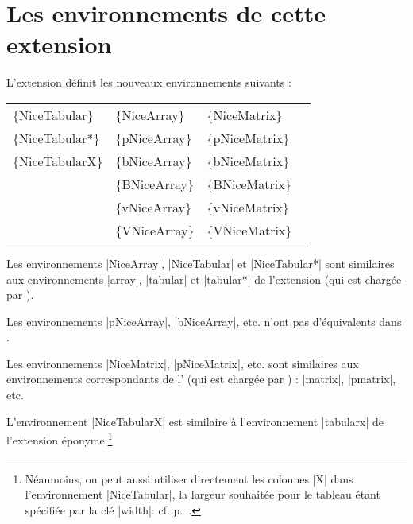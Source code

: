 \documentclass[dvipsnames]{article}%
\begin{document}
\newpage

\section{Les environnements de cette extension}




L'extension  définit les nouveaux environnements suivants :

\medskip
\begin{ttfamily}
\setlength{\tabcolsep}{3mm}
\begin{tabular}{llll}
\{NiceTabular\}  & \{NiceArray\}  & \{NiceMatrix\}   \\
\{NiceTabular*\} & \{pNiceArray\} & \{pNiceMatrix\}  \\
\{NiceTabularX\} & \{bNiceArray\} & \{bNiceMatrix\}  \\
                 & \{BNiceArray\} & \{BNiceMatrix\}  \\
                 & \{vNiceArray\} & \{vNiceMatrix\}  \\
                 & \{VNiceArray\} & \{VNiceMatrix\}
\end{tabular}
\end{ttfamily}


\medskip
Les environnements |{NiceArray}|, |{NiceTabular}| et |{NiceTabular*}| sont
similaires aux environnements |{array}|, |{tabular}| et |{tabular*}| de
l'extension  (qui est chargée par ).


\medskip
Les environnements |{pNiceArray}|, |{bNiceArray}|, etc. n'ont pas d'équivalents
dans .

\medskip
Les environnements |{NiceMatrix}|, |{pNiceMatrix}|, etc. sont similaires aux
environnements correspondants de l' (qui est chargée par
) : |{matrix}|, |{pmatrix}|, etc.

\medskip
L'environnement |{NiceTabularX}| est similaire à l'environnement |{tabularx}| de
l'extension éponyme.\footnote{Néanmoins, on peut aussi utiliser directement les
  colonnes |X| dans l'environnement |{NiceTabular}|, la largeur
  souhaitée pour le tableau étant spécifiée par la clé |width|: cf.
  p.~\pageref{colonne-X}.}
\end{document}
